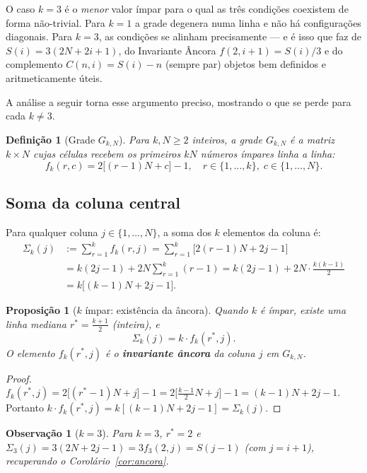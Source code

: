 \documentclass[12pt, a4paper]{article}
\newtheorem{proposicao}[lema]{Proposição}
\newtheorem{observacao}[lema]{Observação}
\newtheorem{definicao}[lema]{Definição}
\begin{document}
	O caso $k=3$ é o \emph{menor} valor ímpar para o qual as três condições
	coexistem de forma não-trivial. Para $k=1$ a grade degenera numa linha e
	não há configurações diagonais. Para $k=3$, as condições se alinham
	precisamente — e é isso que faz de $S(i)=3(2N+2i+1)$, do Invariante
	Âncora $f(2,i+1)=S(i)/3$ e do complemento $C(n,i)=S(i)-n$ (sempre par)
	objetos bem definidos e aritmeticamente úteis.
	
	A análise a seguir torna esse argumento preciso, mostrando o que se perde
	para cada $k\ne 3$.
	
	\begin{definicao}[Grade $G_{k,N}$]
		Para $k,N\ge 2$ inteiros, a grade $G_{k,N}$ é a matriz $k\times N$ cujas células
		recebem os primeiros $kN$ números ímpares linha a linha:
		\[
		f_k(r,c) = 2\bigl[(r-1)N+c\bigr]-1,\quad r\in\{1,\dots,k\},\;c\in\{1,\dots,N\}.
		\]
	\end{definicao}
	
	\subsection{Soma da coluna central}
	
	Para qualquer coluna $j\in\{1,\dots,N\}$, a soma dos $k$ elementos da coluna é:
	\begin{align*}
		\Sigma_k(j) &:= \sum_{r=1}^{k} f_k(r,j)
		= \sum_{r=1}^{k} \bigl[2(r-1)N + 2j -1\bigr]\\
		&= k(2j-1) + 2N\sum_{r=1}^{k}(r-1)
		= k(2j-1) + 2N\cdot\frac{k(k-1)}{2}\\
		&= k\bigl[(k-1)N + 2j - 1\bigr].
	\end{align*}
	
	\begin{proposicao}[$k$ ímpar: existência da âncora]
		\label{prop:kpar}
		Quando $k$ é ímpar, existe uma linha mediana $r^*=\frac{k+1}{2}$ (inteira), e
		\[
		\Sigma_k(j) = k\cdot f_k(r^*,j).
		\]
		O elemento $f_k(r^*,j)$ é o \textbf{invariante âncora} da coluna $j$ em
		$G_{k,N}$.
	\end{proposicao}
	
	\begin{proof}
		$f_k(r^*,j)=2\bigl[(r^*-1)N+j\bigr]-1=2\bigl[\frac{k-1}{2}N+j\bigr]-1=(k-1)N+2j-1$.
		Portanto $k\cdot f_k(r^*,j)=k[(k-1)N+2j-1]=\Sigma_k(j)$.
	\end{proof}
	
	\begin{observacao}[$k=3$]
		Para $k=3$, $r^*=2$ e $\Sigma_3(j)=3(2N+2j-1)=3f_3(2,j)=S(j-1)$ (com $j=i+1$),
		recuperando o Corolário~\ref{cor:ancora}.
	\end{observacao}
	
\end{document}
